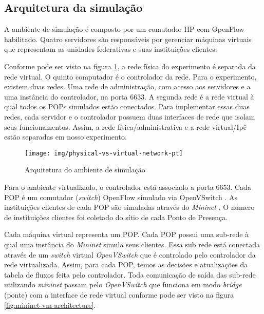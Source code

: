 
\subsection{Arquitetura da simulação}

A ambiente de simulação é composto por um comutador HP com OpenFlow habilitado.
Quatro servidores são responsáveis por gerenciar máquinas virtuais que 
representam as unidades federativas e suas instituições clientes.

Conforme pode ser visto na figura \ref{fig:physical-vs-virtual-network}, a
rede física do experimento é separada da rede virtual.
O quinto computador é o controlador da rede. 
Para o experimento, existem duas redes. 
Uma rede de administração, com acesso aos servidores e a uma instância do 
controlador, na porta 6633.
A segunda rede é a rede virtual à qual todos os POPs simulados estão 
conectados. 
Para implementar essas duas redes, cada servidor e o controlador possuem duas
interfaces de rede que isolam seus funcionamentos.
Assim, a rede física/administrativa e a rede virtual/Ipê estão separadas
em nosso experimento.


\begin{figure}[!h]
    \centering
    \label{fig:physical-vs-virtual-network}
    \texttt{[image: img/physical-vs-virtual-network-pt]}
    \caption{Arquitetura do ambiente de simulação}
\end{figure}

Para o ambiente virtualizado, o controlador está associado a porta 6653.
Cada POP é um comutador (\emph{switch}) OpenFlow simulado via OpenVSwitch
\citep{openvswitch2015comutador}.
As instituições clientes de cada POP são simuladas através do \emph{Mininet} 
\citep{lantz2010network}.
O número de instituições clientes foi coletado do sítio de cada Ponto de 
Presença.

Cada máquina virtual representa um POP.
Cada POP possui uma sub-rede à qual uma instância do \emph{Mininet} simula 
seus clientes. 
Essa sub rede está conectada através de um \emph{switch} virtual 
\emph{OpenVSwitch} que é controlado pelo controlador da rede virtualizada.
Assim, para cada POP, temos as decisões e atualizações da tabela de fluxos
feita pelo controlador.
Toda comunicação de saída das sub-rede utilizando \emph{mininet} passam pelo 
\emph{OpenVSwitch} que funciona em modo \emph{bridge} (ponte) com a interface
de rede virtual conforme pode ser visto na figura
\ref{fig:mininet-vm-architecture}.


